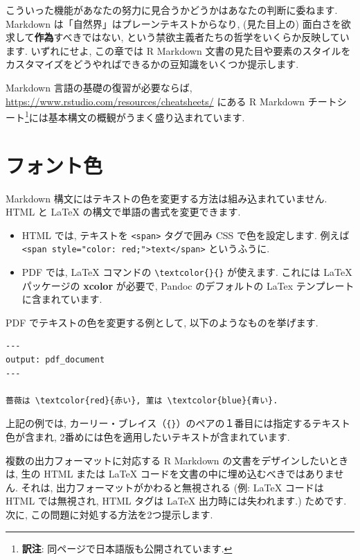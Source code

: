 \documentclass[
  11pt,
  lualatex,
  ja=standard]{bxjsreport}
\begin{document}
こういった機能があなたの努力に見合うかどうかはあなたの判断に委ねます. Markdown は「自然界」はプレーンテキストからなり, (見た目上の) 面白さを欲求して\textbf{作為}すべきではない, という禁欲主義者たちの哲学をいくらか反映しています. いずれにせよ, この章では R Markdown 文書の見た目や要素のスタイルをカスタマイズをどうやればできるかの豆知識をいくつか提示します.

Markdown 言語の基礎の復習が必要ならば, \url{https://www.rstudio.com/resources/cheatsheets/} にある R Markdown チートシート\footnote{\textbf{訳注}: 同ページで日本語版も公開されています.}には基本構文の概観がうまく盛り込まれています.

\hypertarget{font-color}{%
\section{フォント色}\label{font-color}}

Markdown 構文にはテキストの色を変更する方法は組み込まれていません. HTML と LaTeX の構文で単語の書式を変更できます.

\begin{itemize}
\item
  HTML では, テキストを \texttt{\textless{}span\textgreater{}} タグで囲み CSS で色を設定します. 例えば \texttt{\textless{}span\ style="color:\ red;"\textgreater{}text\textless{}/span\textgreater{}} というふうに.
\item
  PDF では, LaTeX コマンドの \texttt{\textbackslash{}textcolor\{\}\{\}} が使えます. これには LaTeX パッケージの \textbf{xcolor} が必要で, Pandoc のデフォルトの LaTex テンプレートに含まれています.
\end{itemize}

PDF でテキストの色を変更する例として, 以下のようなものを挙げます.

\begin{verbatim}
---
output: pdf_document
---

薔薇は \textcolor{red}{赤い}, 菫は \textcolor{blue}{青い}.
\end{verbatim}

上記の例では, カーリー・ブレイス（\texttt{\{\}}）のペアの１番目には指定するテキスト色が含まれ, 2番めには色を適用したいテキストが含まれています.

複数の出力フォーマットに対応する R Markdown の文書をデザインしたいときは, 生の HTML または LaTeX コードを文書の中に埋め込むべきではありません. それは, 出力フォーマットがかわると無視される (例: LaTeX コードは HTML では無視され, HTML タグは LaTeX 出力時には失われます.) ためです. 次に, この問題に対処する方法を2つ提示します.
\end{document}
